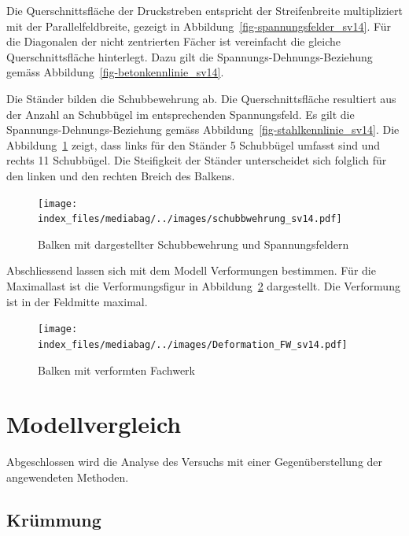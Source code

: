 \documentclass[
  12pt,
  letterpaper,
  egregdoesnotlikesansseriftitles]{scrreprt}
\begin{document}
Die Querschnittsfläche der Druckstreben entspricht der Streifenbreite
multipliziert mit der Parallelfeldbreite, gezeigt in
Abbildung~\ref{fig-spannungsfelder_sv14}. Für die Diagonalen der nicht
zentrierten Fächer ist vereinfacht die gleiche Querschnittsfläche
hinterlegt. Dazu gilt die Spannungs-Dehnungs-Beziehung gemäss
Abbildung~\ref{fig-betonkennlinie_sv14}.

Die Ständer bilden die Schubbewehrung ab. Die Querschnittsfläche
resultiert aus der Anzahl an Schubbügel im entsprechenden Spannungsfeld.
Es gilt die Spannungs-Dehnungs-Beziehung gemäss
Abbildung~\ref{fig-stahlkennlinie_sv14}. Die
Abbildung~\ref{fig-schubbew_fw_sv14} zeigt, dass links für den Ständer 5
Schubbügel umfasst sind und rechts 11 Schubbügel. Die Steifigkeit der
Ständer unterscheidet sich folglich für den linken und den rechten
Breich des Balkens.

\begin{figure}[H]

{\centering \texttt{[image: index\_files/mediabag/../images/schubbwehrung\_sv14.pdf]}

}

\caption{\label{fig-schubbew_fw_sv14}Balken mit dargestellter
Schubbewehrung und Spannungsfeldern}

\end{figure}

Abschliessend lassen sich mit dem Modell Verformungen bestimmen. Für die
Maximallast ist die Verformungsfigur in
Abbildung~\ref{fig-verformung_fachwerk_sv14} dargestellt. Die Verformung
ist in der Feldmitte maximal.

\begin{figure}[H]

{\centering \texttt{[image: index\_files/mediabag/../images/Deformation\_FW\_sv14.pdf]}

}

\caption{\label{fig-verformung_fachwerk_sv14}Balken mit verformten
Fachwerk}

\end{figure}

\hypertarget{modellvergleich-1}{%
\section{Modellvergleich}\label{modellvergleich-1}}

Abgeschlossen wird die Analyse des Versuchs mit einer Gegenüberstellung
der angewendeten Methoden.

\hypertarget{kruxfcmmung-1}{%
\subsection{Krümmung}\label{kruxfcmmung-1}}
\end{document}

